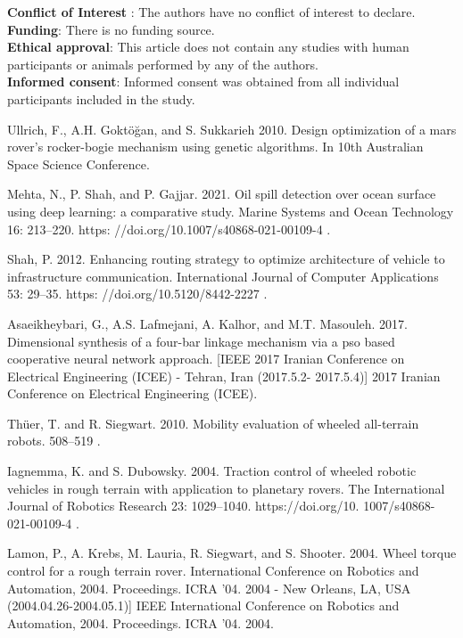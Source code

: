 \documentclass[default,iicol]{sn-jnl}
\theoremstyle{thmstyleone}
\theoremstyle{thmstyletwo}
\theoremstyle{thmstylethree}
\begin{document}
\textbf{Conflict of Interest} : The authors have no conflict of interest to declare.\\        

\textbf{Funding}: There is no funding source.\\

\textbf{Ethical approval}: This article does not contain any studies with human participants or animals performed by any of the authors.\\

\textbf{Informed consent}: Informed consent was obtained from all individual participants included in the study.\\
% 
%  
\begin{thebibliography}{99}

Ullrich, F., A.H. Gokt{\"{o}}{\u{g}}an, and S. Sukkarieh 2010. Design optimization of a mars rover’s rocker-bogie mechanism using genetic algorithms. In 10th Australian Space Science Conference.

Mehta, N., P. Shah, and P. Gajjar. 2021. Oil spill detection over ocean surface using deep learning: a comparative study. Marine Systems and Ocean Technology 16: 213–220. https: //doi.org/10.1007/s40868-021-00109-4 .

Shah, P. 2012. Enhancing routing strategy to optimize architecture of vehicle to infrastructure communication. International Journal of Computer Applications 53: 29–35. https: //doi.org/10.5120/8442-2227 .


 Asaeikheybari, G., A.S. Lafmejani, A. Kalhor,
and M.T. Masouleh. 2017. Dimensional synthesis of a four-bar linkage mechanism via a pso
based cooperative neural network approach.
[IEEE 2017 Iranian Conference on Electrical
Engineering (ICEE) - Tehran, Iran (2017.5.2- 2017.5.4)] 2017 Iranian Conference on Electrical Engineering (ICEE).


Th{\"{u}}er, T. and R. Siegwart. 2010. Mobility evaluation of wheeled all-terrain robots.
508–519 .


Iagnemma, K. and S. Dubowsky. 2004. Traction control of wheeled robotic vehicles in rough terrain with application to planetary rovers. The International Journal of Robotics Research 23: 1029–1040. https://doi.org/10. 1007/s40868-021-00109-4 .


Lamon, P., A. Krebs, M. Lauria, R. Siegwart, and S. Shooter. 2004. Wheel torque control for a rough terrain rover. International Conference on Robotics and Automation, 2004. Proceedings. ICRA ’04. 2004 - New Orleans, LA, USA (2004.04.26-2004.05.1)] IEEE International Conference on Robotics and Automation, 2004. Proceedings. ICRA ’04. 2004.


\end{thebibliography}
\end{document}
